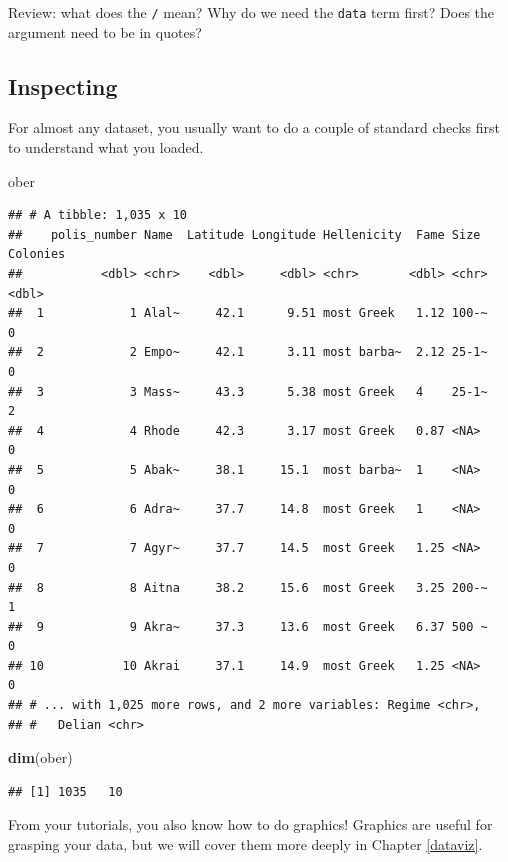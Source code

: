 \documentclass[]{book}
\newenvironment{Shaded}{\begin{snugshade}}{\end{snugshade}}
\newcommand{\KeywordTok}[1]{\textcolor[rgb]{0.13,0.29,0.53}{\textbf{#1}}}
\newcommand{\NormalTok}[1]{#1}
\theoremstyle{definition}
\theoremstyle{definition}
\theoremstyle{definition}
\theoremstyle{remark}
\begin{document}
Review: what does the \texttt{/} mean? Why do we need the \texttt{data} term first? Does the argument need to be in quotes?

\hypertarget{inspecting}{%
\subsection{Inspecting}\label{inspecting}}

For almost any dataset, you usually want to do a couple of standard checks first to understand what you loaded.

\begin{Shaded}
\begin{Highlighting}[]
\NormalTok{ober}
\end{Highlighting}
\end{Shaded}

\begin{verbatim}
## # A tibble: 1,035 x 10
##    polis_number Name  Latitude Longitude Hellenicity  Fame Size  Colonies
##           <dbl> <chr>    <dbl>     <dbl> <chr>       <dbl> <chr>    <dbl>
##  1            1 Alal~     42.1      9.51 most Greek   1.12 100-~        0
##  2            2 Empo~     42.1      3.11 most barba~  2.12 25-1~        0
##  3            3 Mass~     43.3      5.38 most Greek   4    25-1~        2
##  4            4 Rhode     42.3      3.17 most Greek   0.87 <NA>         0
##  5            5 Abak~     38.1     15.1  most barba~  1    <NA>         0
##  6            6 Adra~     37.7     14.8  most Greek   1    <NA>         0
##  7            7 Agyr~     37.7     14.5  most Greek   1.25 <NA>         0
##  8            8 Aitna     38.2     15.6  most Greek   3.25 200-~        1
##  9            9 Akra~     37.3     13.6  most Greek   6.37 500 ~        0
## 10           10 Akrai     37.1     14.9  most Greek   1.25 <NA>         0
## # ... with 1,025 more rows, and 2 more variables: Regime <chr>,
## #   Delian <chr>
\end{verbatim}

\begin{Shaded}
\begin{Highlighting}[]
\KeywordTok{dim}\NormalTok{(ober)}
\end{Highlighting}
\end{Shaded}

\begin{verbatim}
## [1] 1035   10
\end{verbatim}

From your tutorials, you also know how to do graphics! Graphics are useful for grasping your data, but we will cover them more deeply in Chapter \ref{dataviz}.
\end{document}
